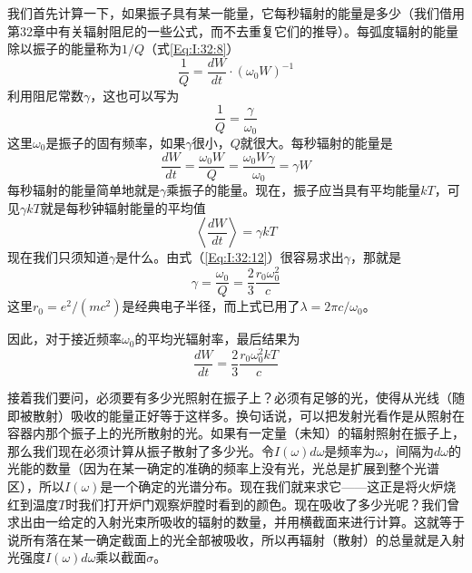我们首先计算一下，如果振子具有某一能量，它每秒辐射的能量是多少（我们借用第32章中有关辐射阻尼的一些公式，而不去重复它们的推导）。每弧度辐射的能量除以振子的能量称为$1/Q$（式\ref{Eq:I:32:8}）
\begin{equation*}
    \frac{1}{Q} = \frac{dW}{dt} \cdot (\omega_0W)^{-1}
\end{equation*}
利用阻尼常数$\gamma$，这也可以写为
\begin{equation*}
    \frac{1}{Q} = \frac{\gamma}{\omega_0}
\end{equation*}
这里$\omega_0$是振子的固有频率，如果$\gamma$很小，$Q$就很大。每秒辐射的能量是
\begin{equation}
    \label{Eq:I:41:4}
    \frac{dW}{dt} = \frac{\omega_0W}{Q} = \frac{\omega_0W\gamma}{\omega_0} = \gamma W
\end{equation}
每秒辐射的能量简单地就是$\gamma$乘振子的能量。现在，振子应当具有平均能量$kT$，可见$\gamma kT$就是每秒钟辐射能量的平均值
\begin{equation}
    \label{Eq:I:41:5}
    \left \langle \frac{dW}{dt} \right \rangle = \gamma kT
\end{equation}
现在我们只须知道$\gamma$是什么。由式（\ref{Eq:I:32:12}）很容易求出$\gamma$，那就是
\begin{equation}
    \label{Eq:I:41:6}
    \gamma = \frac{\omega_0}{Q} = \frac{2}{3}\frac{r_0\omega_0^2}{c}
\end{equation}
这里$r_0=e^2/(mc^2)$是经典电子半径，而上式已用了$\lambda=2\pi c/\omega_0$。

因此，对于接近频率$\omega_0$的平均光辐射率，最后结果为
\begin{equation}
    \label{Eq:I:41:7}
    \frac{dW}{dt} = \frac{2}{3}\frac{r_0\omega_0^2 kT}{c}
\end{equation}

接着我们要问，必须要有多少光照射在振子上？必须有足够的光，使得从光线（随即被散射）吸收的能量正好等于这样多。换句话说，可以把发射光看作是从照射在容器内那个振子上的光所散射的光。如果有一定量（未知）的辐射照射在振子上，那么我们现在必须计算从振子散射了多少光。令$I(\omega)d\omega$是频率为$\omega$，间隔为$d\omega$的光能的数量（因为在某一确定的准确的频率上没有光，光总是扩展到整个光谱区），所以$I(\omega)$是一个确定的光谱分布。现在我们就来求它——这正是将火炉烧红到温度$T$时我们打开炉门观察炉膛时看到的颜色。现在吸收了多少光呢？我们曾求出由一给定的入射光束所吸收的辐射的数量，并用横截面来进行计算。这就等于说所有落在某一确定截面上的光全部被吸收，所以再辐射（散射）的总量就是入射光强度$I(\omega)d\omega$乘以截面$\sigma$。


